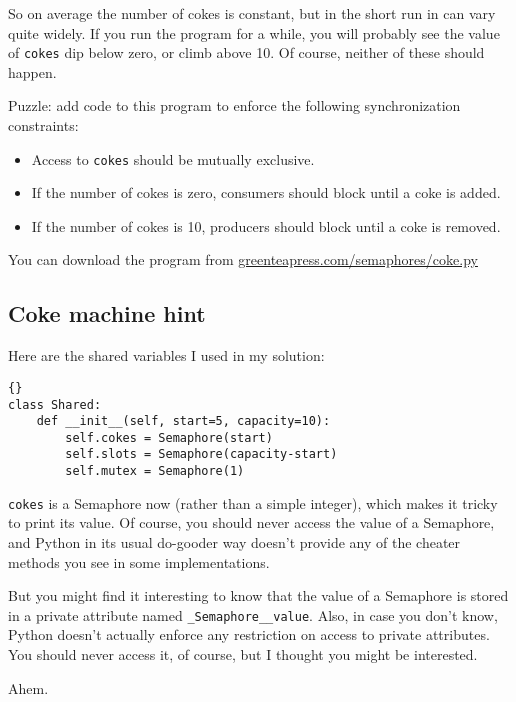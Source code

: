 \documentclass{book}
\newcommand{\clearemptydoublepage}{\newpage\cleardoublepage}
\begin{document}
So on average the number of cokes is constant, but in the short
run in can vary quite widely.  If you run the program for a
while, you will probably see the value of {\tt cokes} dip
below zero, or climb above 10.  Of course, neither of these
should happen.

Puzzle: add code to this program to enforce the following
synchronization constraints:

\begin{itemize}

\item Access to {\tt cokes} should be mutually exclusive.

\item If the number of cokes is zero, consumers should block
until a coke is added.

\item If the number of cokes is 10, producers should block
until a coke is removed.

\end{itemize}

You can download the program from
\url{greenteapress.com/semaphores/coke.py}


\clearemptydoublepage
\subsection {Coke machine hint}

Here are the shared variables I used in my solution:

\begin{lstlisting}[title={}]{}
class Shared:
    def __init__(self, start=5, capacity=10):
        self.cokes = Semaphore(start)
        self.slots = Semaphore(capacity-start)
        self.mutex = Semaphore(1)
\end{lstlisting}

{\tt cokes} is a Semaphore now (rather than a simple integer), 
which makes it tricky to print its value.  Of course, you
should never access the value of a Semaphore, and Python in
its usual do-gooder way doesn't provide any of the cheater
methods you see in some implementations.

But you might find it interesting to know that the value
of a Semaphore is stored in a private attribute named
{\tt \_Semaphore\_\_value}.  Also, in case you don't know,
Python doesn't actually enforce any restriction on access to
private attributes.  You should never access it, of course,
but I thought you might be interested.

Ahem.
\end{document}
